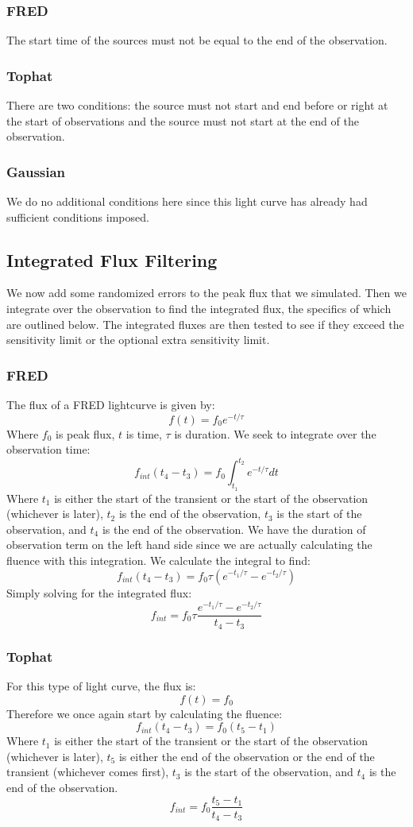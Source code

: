 \documentclass{article}
\begin{document}
\subsubsection{FRED}
The start time of the sources must not be equal to the end of the observation.
\subsubsection{Tophat}
There are two conditions: the source must not start and end before or right at the start of observations and the source must not start at the end of the observation.
\subsubsection{Gaussian}
We do no additional conditions here since this light curve has already had sufficient conditions imposed.
\subsection{Integrated Flux Filtering}
We now add some randomized errors to the peak flux that we simulated. Then we integrate over the observation to find the integrated flux, the specifics of which are outlined below. The integrated fluxes are then tested to see if they exceed the sensitivity limit or the optional extra sensitivity limit. 
\subsubsection{FRED}
The flux of a FRED lightcurve is given by:
\[f(t)=f_0e^{-t/\tau}\]
Where $f_0$ is peak flux, $t$ is time, $\tau$ is duration. We seek to integrate over the observation time:
\[f_{int}(t_4-t_3) = f_0\int_{t_1}^{t_2}e^{-t/\tau}dt\]
Where $t_1$ is either the start of the transient or the start of the observation (whichever is later), $t_2$ is the end of the observation, $t_3$ is the start of the observation, and $t_4$ is the end of the observation. We have the duration of observation term on the left hand side since we are actually calculating the fluence with this integration. We calculate the integral to find:
\[f_{int}(t_4-t_3) = f_0\tau (e^{-t_{1}/\tau}-e^{-t_2/\tau})\]
Simply solving for the integrated flux:
\[f_{int} = f_0\tau \frac{e^{-t_{1}/\tau}-e^{-t_2/\tau}}{t_4-t_3}\]
\subsubsection{Tophat}
For this type of light curve, the flux is:
\[f(t) = f_0\]
Therefore we once again start by calculating the fluence:
\[f_{int} (t_4-t_3) = f_0 (t_5-t_1)\]
Where $t_1$ is either the start of the transient or the start of the observation (whichever is later), $t_5$ is either the end of the observation or the end of the transient (whichever comes first), $t_3$ is the start of the observation, and $t_4$ is the end of the observation.
\[f_{int}  = f_0 \frac{t_5-t_1}{t_4-t_3}\]
\end{document}
